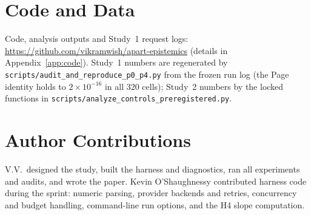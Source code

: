 \documentclass[10pt]{article}
\theoremstyle{manuscript}\newtheorem{proposition}{Proposition}
\begin{document}
\section*{Code and Data}
Code, analysis outputs and Study~1 request logs: \url{https://github.com/vikramwish/apart-epistemics} (details in Appendix~\ref{app:code}). Study~1 numbers are regenerated by \texttt{scripts/audit\_and\_reproduce\_p0\_p4.py} from the frozen run log (the Page identity holds to $2\times10^{-16}$ in all 320 cells); Study~2 numbers by the locked functions in \texttt{scripts/analyze\_controls\_preregistered.py}.

\section*{Author Contributions}
V.V.\ designed the study, built the harness and diagnostics, ran all experiments and audits, and wrote the paper. Kevin O'Shaughnessy contributed harness code during the sprint: numeric parsing, provider backends and retries, concurrency and budget handling, command-line run options, and the H4 slope computation.
\end{document}
